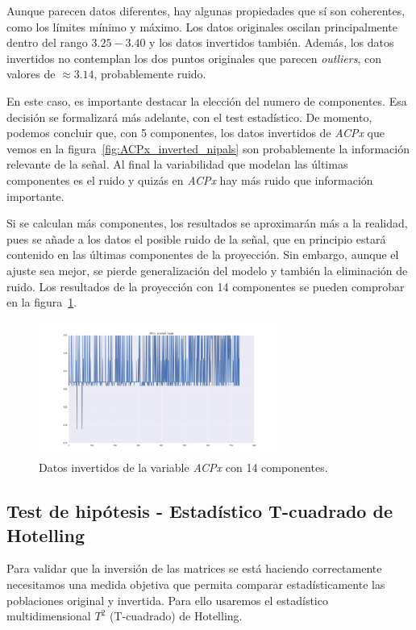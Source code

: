 \documentclass[11pt,spanish,listoffigures,listoftables]{tfgetsinf}
\begin{document}
    Aunque parecen datos diferentes, hay algunas propiedades que sí son coherentes, como los límites mínimo y máximo. Los datos originales oscilan principalmente dentro del rango \(3.25-3.40\) y los datos invertidos también. Además, los datos invertidos no contemplan los dos puntos originales que parecen {\em outliers}, con valores de \(\approx 3.14\), probablemente ruido.
    
    En este caso, es importante destacar la elección del numero de componentes. Esa decisión se formalizará más adelante, con el test estadístico. De momento, podemos concluir que, con 5 componentes, los datos invertidos de {\em ACPx} que vemos en la figura~\ref{fig:ACPx_inverted_nipals} son probablemente la información relevante de la señal. Al final la variabilidad que modelan las últimas componentes es el ruido y quizás en {\em ACPx} hay más ruido que información importante.
    
    Si se calculan más componentes, los resultados se aproximarán más a la realidad, pues se añade a los datos el posible ruido de la señal, que en principio estará contenido en las últimas componentes de la proyección. Sin embargo, aunque el ajuste sea mejor, se pierde generalización del modelo y también la eliminación de ruido. Los resultados de la proyección con 14 componentes se pueden comprobar en la figura~\ref{fig:ACPx_inverted_nipals_pca14}.
    
    \begin{figure}[H]
        \centering
        \includegraphics[width=0.7\textwidth]{ACPx_inverted_nipals_pca14.png}
        \caption{Datos invertidos de la variable {\em ACPx} con 14 componentes.}
        \label{fig:ACPx_inverted_nipals_pca14}
    \end{figure}


    \subsection{Test de hipótesis - Estadístico T-cuadrado de Hotelling}
    Para validar que la inversión de las matrices se está haciendo correctamente necesitamos una medida objetiva que permita comparar estadísticamente las poblaciones original y invertida. Para ello usaremos el estadístico multidimensional \(T^2\) (T-cuadrado) de Hotelling. 
    
\end{document}
